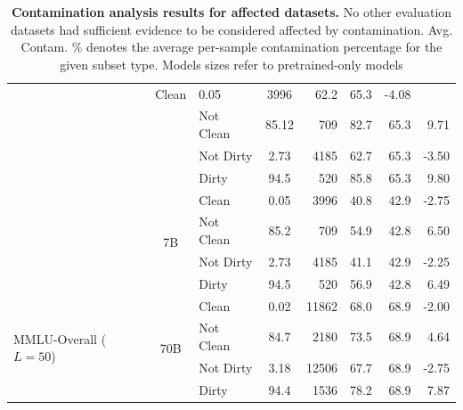 \documentclass{article}
\begin{document}
\begin{table}[]
\begin{tabular}{lclcrrrr}
                                                        & Clean     &     0.05   & 3996  & 62.2      & 65.3    & -4.08 \\ 
                                &                      & Not Clean  &    85.12   &  709  & 82.7      & 65.3    &  9.71 \\ 
                                &                      & Not Dirty  &     2.73   & 4185  & 62.7      & 65.3    & -3.50 \\ 
                                &                      & Dirty      &    94.5    &  520  & 85.8      & 65.3    &  9.80\\ 
                                & \multirow{4}{*}{7B}  & Clean      &     0.05   & 3996  & 40.8      & 42.9    & -2.75 \\ 
                                &                      & Not Clean  &    85.2    &  709  & 54.9      & 42.8    &  6.50 \\ 
                                &                      & Not Dirty  &     2.73   & 4185  & 41.1      & 42.9    & -2.25 \\ 
                                &                      & Dirty      &    94.5    &  520  & 56.9      & 42.8    &  6.49 \\
                                \midrule
\multirow{4}{*}{MMLU-Overall ($L=50$)} & \multirow{4}{*}{70B}                                 
                                                        & Clean      &  0.02     & 11862 & 68.0      & 68.9    & -2.00 \\ 
                                &                      & Not Clean   & 84.7      &  2180 & 73.5      & 68.9    &  4.64 \\ 
                                &                      & Not Dirty   &  3.18     & 12506 & 67.7      & 68.9    & -2.75 \\ 
                                &                      & Dirty       & 94.4      &  1536 & 78.2      & 68.9    &  7.87\\ 
                                \bottomrule
                               
\end{tabular}
\caption{\textbf{Contamination analysis results for affected datasets.} No other evaluation datasets had sufficient evidence to be considered affected by contamination. Avg. Contam. \% denotes the average per-sample contamination percentage for the given subset type. Models sizes refer to pretrained-only models}
\label{tab:contamination}
\end{table}
\end{document}
